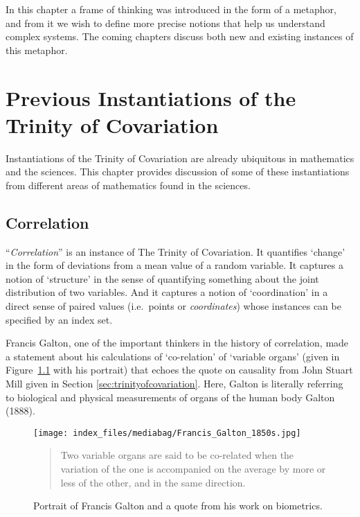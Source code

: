 \documentclass[
  letterpaper,
  DIV=11,
  numbers=noendperiod]{scrreprt}
\begin{document}
In this chapter a frame of thinking was introduced in the form of a
metaphor, and from it we wish to define more precise notions that help
us understand complex systems. The coming chapters discuss both new and
existing instances of this metaphor.


\chapter{Previous Instantiations of the Trinity of
Covariation}\label{previous-instantiations-of-the-trinity-of-covariation}

Instantiations of the Trinity of Covariation are already ubiquitous in
mathematics and the sciences. This chapter provides discussion of some
of these instantiations from different areas of mathematics found in the
sciences.

\section{Correlation}\label{correlation}

``\emph{Correlation}'' is an instance of The Trinity of Covariation. It
quantifies `change' in the form of deviations from a mean value of a
random variable. It captures a notion of `structure' in the sense of
quantifying something about the joint distribution of two variables. And
it captures a notion of `coordination' in a direct sense of paired
values (i.e.~points or \emph{coordinates}) whose instances can be
specified by an index set.

Francis Galton, one of the important thinkers in the history of
correlation, made a statement about his calculations of `co-relation' of
`variable organs' (given in Figure~\ref{fig-galton-quote} with his
portrait) that echoes the quote on causality from John Stuart Mill given
in Section \ref{sec:trinityofcovariation}. Here, Galton is literally
referring to biological and physical measurements of organs of the human
body Galton (1888).

\begin{figure}

\begin{minipage}{0.50\linewidth}

\texttt{[image: index\_files/mediabag/Francis\_Galton\_1850s.jpg]}

\end{minipage}%
%
\begin{minipage}{0.50\linewidth}

\begin{quote}
Two variable organs are said to be co-related when the variation of the
one is accompanied on the average by more or less of the other, and in
the same direction.
\end{quote}

\end{minipage}%

\caption{\label{fig-galton-quote}Portrait of Francis Galton and a quote
from his work on biometrics.}

\end{figure}%
\end{document}
